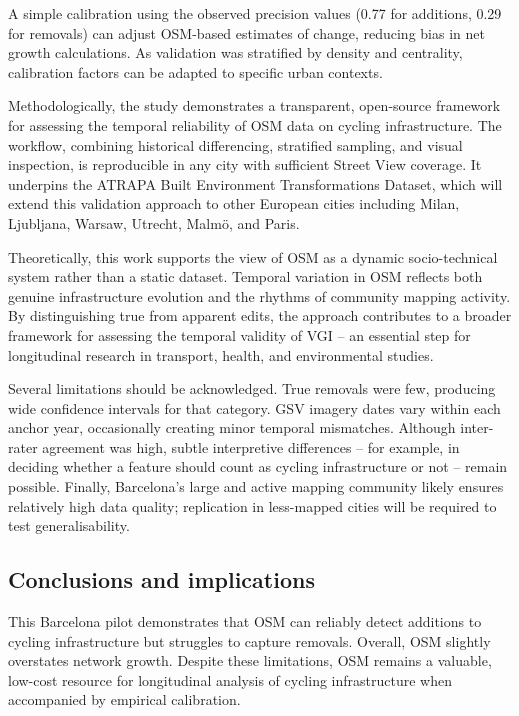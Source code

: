 \documentclass[
  preprint, 3p, authoryear]{article}
\begin{document}
A simple calibration using the observed precision values (0.77 for
additions, 0.29 for removals) can adjust OSM-based estimates of change,
reducing bias in net growth calculations. As validation was stratified
by density and centrality, calibration factors can be adapted to
specific urban contexts.

Methodologically, the study demonstrates a transparent, open-source
framework for assessing the temporal reliability of OSM data on cycling
infrastructure. The workflow, combining historical differencing,
stratified sampling, and visual inspection, is reproducible in any city
with sufficient Street View coverage. It underpins the ATRAPA Built
Environment Transformations Dataset, which will extend this validation
approach to other European cities including Milan, Ljubljana, Warsaw,
Utrecht, Malmö, and Paris.

Theoretically, this work supports the view of OSM as a dynamic
socio-technical system rather than a static dataset. Temporal variation
in OSM reflects both genuine infrastructure evolution and the rhythms of
community mapping activity. By distinguishing true from apparent edits,
the approach contributes to a broader framework for assessing the
temporal validity of VGI -- an essential step for longitudinal research
in transport, health, and environmental studies.

Several limitations should be acknowledged. True removals were few,
producing wide confidence intervals for that category. GSV imagery dates
vary within each anchor year, occasionally creating minor temporal
mismatches. Although inter-rater agreement was high, subtle interpretive
differences -- for example, in deciding whether a feature should count
as cycling infrastructure or not -- remain possible. Finally,
Barcelona's large and active mapping community likely ensures relatively
high data quality; replication in less-mapped cities will be required to
test generalisability.

\subsection{Conclusions and
implications}\label{conclusions-and-implications}

This Barcelona pilot demonstrates that OSM can reliably detect additions
to cycling infrastructure but struggles to capture removals. Overall,
OSM slightly overstates network growth. Despite these limitations, OSM
remains a valuable, low-cost resource for longitudinal analysis of
cycling infrastructure when accompanied by empirical calibration.
\end{document}
